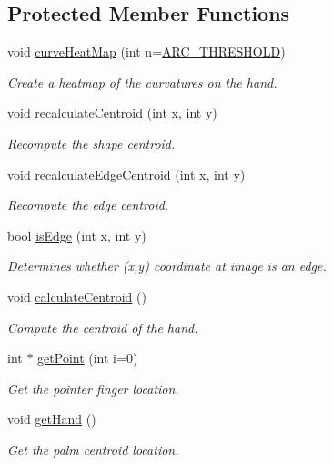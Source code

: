 \subsection*{Protected Member Functions}
\begin{DoxyCompactItemize}
\item 
void \hyperlink{class_hand_ae3d90ae264631ad6af2efbb5baddfda6}{curve\+Heat\+Map} (int n=\hyperlink{_hand_8h_ae12b8d82e4eb35d8bd8cca49ba677eac}{A\+R\+C\+\_\+\+T\+H\+R\+E\+S\+H\+O\+LD})
\begin{DoxyCompactList}\small\item\em Create a heatmap of the curvatures on the hand. \end{DoxyCompactList}\item 
void \hyperlink{class_hand_a8d3f0317f1b0e2edd9e89d679e616fbc}{recalculate\+Centroid} (int x, int y)
\begin{DoxyCompactList}\small\item\em Recompute the shape centroid. \end{DoxyCompactList}\item 
void \hyperlink{class_hand_a3af95101a355738577be20c734a46bf0}{recalculate\+Edge\+Centroid} (int x, int y)
\begin{DoxyCompactList}\small\item\em Recompute the edge centroid. \end{DoxyCompactList}\item 
bool \hyperlink{class_hand_a3c9f87cf116838082875016e459127ae}{is\+Edge} (int x, int y)
\begin{DoxyCompactList}\small\item\em Determines whether (x,y) coordinate at image is an edge. \end{DoxyCompactList}\item 
void \hyperlink{class_hand_aaa3e2992447d5cb16b0c9095028b07c0}{calculate\+Centroid} ()
\begin{DoxyCompactList}\small\item\em Compute the centroid of the hand. \end{DoxyCompactList}\item 
int $\ast$ \hyperlink{class_hand_a0d6fb9c0c195ef544e36e6dfe6621bbb}{get\+Point} (int i=0)
\begin{DoxyCompactList}\small\item\em Get the pointer finger location. \end{DoxyCompactList}\item 
void \hyperlink{class_hand_ac55aeccf6d1c8e2aa8105d334cdf1339}{get\+Hand} ()
\begin{DoxyCompactList}\small\item\em Get the palm centroid location. \end{DoxyCompactList}\end{DoxyCompactItemize}
